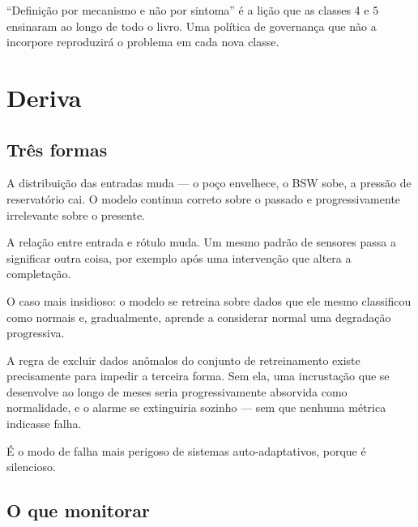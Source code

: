 \begin{destaque}
``Definição por mecanismo e não por sintoma'' é a lição que as classes 4 e 5 ensinaram ao
longo de todo o livro. Uma política de governança que não a incorpore reproduzirá o
problema em cada nova classe.
\end{destaque}

\section{Deriva}

\subsection{Três formas}

\begin{description}[leftmargin=0pt,style=nextline,itemsep=0.4em]

\item[Deriva de dados.] A distribuição das entradas muda --- o poço envelhece, o BSW
sobe, a pressão de reservatório cai. O modelo continua correto sobre o passado e
progressivamente irrelevante sobre o presente.

\item[Deriva de conceito.] A relação entre entrada e rótulo muda. Um mesmo padrão de
sensores passa a significar outra coisa, por exemplo após uma intervenção que altera a
completação.

\item[Deriva induzida pelo próprio sistema.] O caso mais insidioso: o modelo se retreina
sobre dados que ele mesmo classificou como normais e, gradualmente, aprende a considerar
normal uma degradação progressiva.

\end{description}

\begin{destaque}
A regra de excluir dados anômalos do conjunto de retreinamento existe precisamente para
impedir a terceira forma. Sem ela, uma incrustação que se desenvolve ao longo de meses
seria progressivamente absorvida como normalidade, e o alarme se extinguiria sozinho ---
sem que nenhuma métrica indicasse falha.

É o modo de falha mais perigoso de sistemas auto-adaptativos, porque é silencioso.
\end{destaque}

\subsection{O que monitorar}

